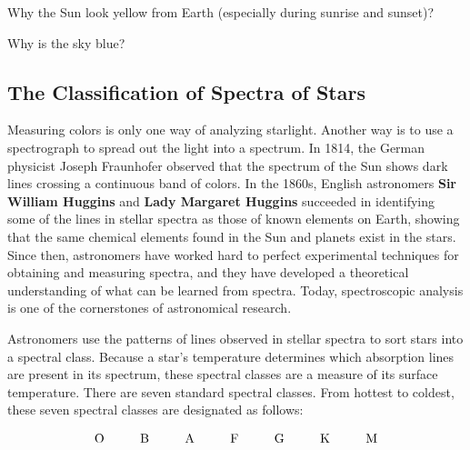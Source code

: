 \documentclass{article}
\numberwithin{equation}{section}
\numberwithin{figure}{section}
\begin{document}
\begin{exercise}
    Why the Sun look yellow from Earth (especially during sunrise and sunset)?
\end{exercise}

\begin{exercise}
    Why is the sky blue?
\end{exercise}


\subsection{The Classification of Spectra of Stars}

Measuring colors is only one way of analyzing starlight. Another way is to use a spectrograph to spread out the light into a spectrum. In 1814, the German physicist Joseph Fraunhofer observed that the spectrum of the Sun shows dark lines crossing a continuous band of colors. In the 1860s, English astronomers \textbf{Sir William Huggins} and \textbf{Lady Margaret Huggins} succeeded in identifying some of the lines in stellar spectra as those of known elements on Earth, showing that the same chemical elements found in the Sun and planets exist in the stars. Since then, astronomers have worked hard to perfect experimental techniques for obtaining and measuring spectra, and they have developed a theoretical understanding of what can be learned from spectra. Today, spectroscopic analysis is one of the cornerstones of astronomical research.

Astronomers use the patterns of lines observed in stellar spectra to sort stars into a spectral class. Because a star's temperature determines which absorption lines are present in its spectrum, these spectral classes are a measure of its surface temperature. There are seven standard spectral classes. From hottest to coldest, these seven spectral classes are designated as follows:
\vspace{-1em}

\begin{align*}
    {\Large \mathrm{O \hspace{2em} 
        B \hspace{2em}
        A \hspace{2em} 
        F \hspace{2em} 
        G \hspace{2em} 
        K \hspace{2em} 
        M}}
\end{align*}
\end{document}
